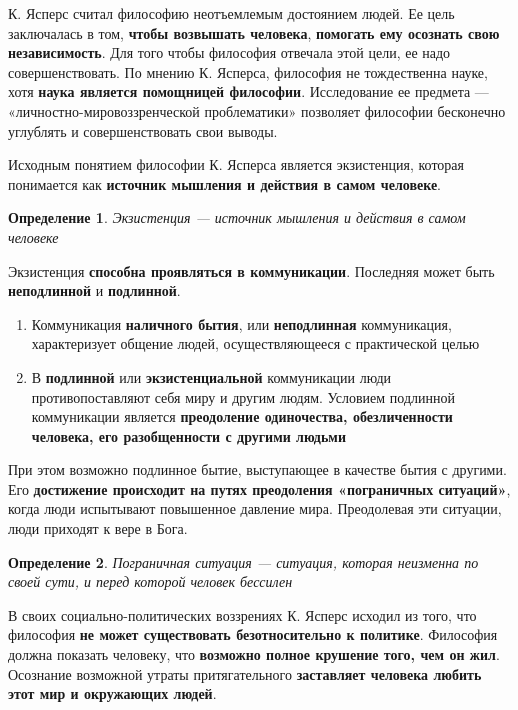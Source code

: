 \documentclass{article}
\newtheorem{definition}{Определение}
\begin{document}
\begin{flushleft}

К. Ясперс считал философию неотъемлемым достоянием людей. Ее цель заключалась в том, \textbf{чтобы возвышать человека}, \textbf{помогать ему осознать свою независимость}. Для того чтобы философия отвечала этой цели, ее надо совершенствовать. По мнению К. Ясперса, философия не тождественна науке, хотя \textbf{наука является помощницей философии}. Исследование ее предмета — «личностно-мировоззренческой проблематики» позволяет философии бесконечно углублять и совершенствовать свои выводы.

Исходным понятием философии К. Ясперса является экзистенция, которая понимается как \textbf{источник мышления и действия в самом человеке}.

\begin{definition}
    Экзистенция — источник мышления и действия в самом человеке
\end{definition}

Экзистенция \textbf{способна проявляться в коммуникации}. Последняя может быть \textbf{неподлинной} и \textbf{подлинной}.

\begin{enumerate}
    \item Коммуникация \textbf{наличного бытия}, или \textbf{неподлинная} коммуникация, характеризует общение людей, осуществляющееся с практической целью
    \item  В \textbf{подлинной} или \textbf{экзистенциальной} коммуникации люди противопоставляют себя миру и другим людям. Условием подлинной коммуникации является \textbf{преодоление одиночества, обезличенности человека, его разобщенности с другими людьми}
\end{enumerate}

При этом возможно подлинное бытие, выступающее в качестве бытия с другими. Его \textbf{достижение происходит на путях преодоления «пограничных ситуаций»}, когда люди испытывают повышенное давление мира. Преодолевая эти ситуации, люди приходят к вере в Бога.

\begin{definition}
    Пограничная ситуация — ситуация, которая неизменна по своей сути, и перед которой человек бессилен
\end{definition}

В своих социально-политических воззрениях К. Ясперс исходил из того, что философия \textbf{не может существовать безотносительно к политике}. Философия должна показать человеку, что \textbf{возможно полное крушение того, чем он жил}. Осознание возможной утраты притягательного \textbf{заставляет человека любить этот мир и окружающих людей}.


\end{flushleft}
\end{document}
